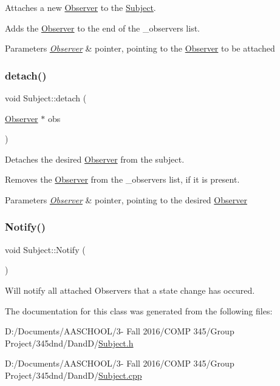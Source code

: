 Attaches a new \hyperlink{class_observer}{Observer} to the \hyperlink{class_subject}{Subject}. 

Adds the \hyperlink{class_observer}{Observer} to the end of the \+\_\+observers list. 
\begin{DoxyParams}{Parameters}
{\em \hyperlink{class_observer}{Observer}} & pointer, pointing to the \hyperlink{class_observer}{Observer} to be attached \\
\hline
\end{DoxyParams}
\hypertarget{class_subject_ad101324d66ad30b943e4fdc31dc16d14}{}\label{class_subject_ad101324d66ad30b943e4fdc31dc16d14} 
\subsubsection{\texorpdfstring{detach()}{detach()}}
{\footnotesize\ttfamily void Subject\+::detach (\begin{DoxyParamCaption}\item[{\hyperlink{class_observer}{Observer} $\ast$}]{obs }\end{DoxyParamCaption})\hspace{0.3cm}{\ttfamily [virtual]}}

Detaches the desired \hyperlink{class_observer}{Observer} from the subject. 

Removes the \hyperlink{class_observer}{Observer} from the \+\_\+observers list, if it is present. 
\begin{DoxyParams}{Parameters}
{\em \hyperlink{class_observer}{Observer}} & pointer, pointing to the desired \hyperlink{class_observer}{Observer} \\
\hline
\end{DoxyParams}
\hypertarget{class_subject_afdf01736ff099d286543b450d96215f1}{}\label{class_subject_afdf01736ff099d286543b450d96215f1} 
\subsubsection{\texorpdfstring{Notify()}{Notify()}}
{\footnotesize\ttfamily void Subject\+::\+Notify (\begin{DoxyParamCaption}{ }\end{DoxyParamCaption})\hspace{0.3cm}{\ttfamily [virtual]}}

Will notify all attached Observers that a state change has occured. 

The documentation for this class was generated from the following files\+:\begin{DoxyCompactItemize}
\item 
D\+:/\+Documents/\+A\+A\+S\+C\+H\+O\+O\+L/3-\/ Fall 2016/\+C\+O\+M\+P 345/\+Group Project/345dnd/\+Dand\+D/\hyperlink{_subject_8h}{Subject.\+h}\item 
D\+:/\+Documents/\+A\+A\+S\+C\+H\+O\+O\+L/3-\/ Fall 2016/\+C\+O\+M\+P 345/\+Group Project/345dnd/\+Dand\+D/\hyperlink{_subject_8cpp}{Subject.\+cpp}\end{DoxyCompactItemize}
